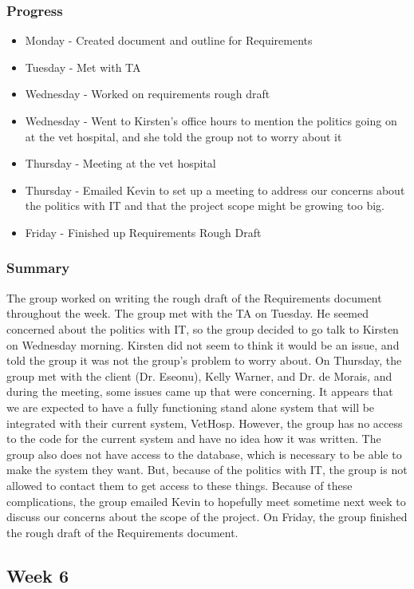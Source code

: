 \documentclass[onecolumn, draftclsnofoot,10pt, compsoc]{IEEEtran}
\begin{document}
\subsubsection{Progress}
\begin{itemize}
\item Monday - Created document and outline for Requirements
\item Tuesday - Met with TA
\item Wednesday - Worked on requirements rough draft
\item Wednesday - Went to Kirsten's office hours to mention the politics going on at the vet hospital, and she told the group not to worry about it
\item Thursday - Meeting at the vet hospital
\item Thursday - Emailed Kevin to set up a meeting to address our concerns about the politics with IT and that the project scope might be growing too big.
\item Friday - Finished up Requirements Rough Draft
\end{itemize}

\subsubsection{Summary}
The group worked on writing the rough draft of the Requirements document throughout the week. The group met with the TA on Tuesday. He seemed concerned about the politics with IT, so the group decided to go talk to Kirsten on Wednesday morning. Kirsten did not seem to think it would be an issue, and told the group it was not the group's problem to worry about. On Thursday, the group met with the client (Dr. Eseonu), Kelly Warner, and Dr. de Morais, and during the meeting, some issues came up that were concerning. It appears that we are expected to have a fully functioning stand alone system that will be integrated with their current system, VetHosp. However, the group has no access to the code for the current system and have no idea how it was written. The group also does not have access to the database, which is necessary to be able to make the system they want. But, because of the politics with IT, the group is not allowed to contact them to get access to these things. Because of these complications, the group emailed Kevin to hopefully meet sometime next week to discuss our concerns about the scope of the project. On Friday, the group finished the rough draft of the Requirements document. 

\subsection{Week 6}
\end{document}
